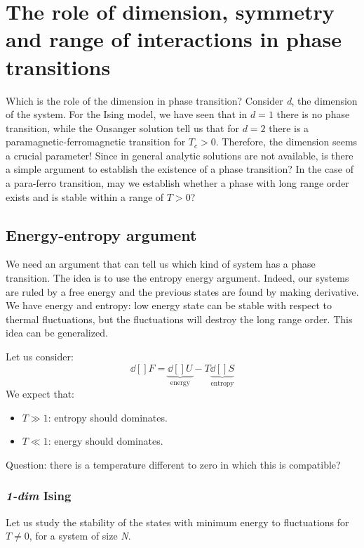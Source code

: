 \documentclass[../../Main/Main.tex]{subfiles}
\begin{document}
\chapter{The role of dimension, symmetry and range of interactions in phase transitions}

Which is the role of the dimension in phase transition? Consider \emph{d}, the dimension of the system.
For the Ising model, we have seen that in \( d=1 \) there is no phase transition, while the Onsanger solution tell us that for \( d=2 \) there is a paramagnetic-ferromagnetic transition for \( T_c >0 \).
Therefore, the dimension seems a crucial parameter!
Since in general analytic solutions are not available, is there a simple argument to establish the existence of a phase transition?
In the case of a para-ferro transition, may we establish whether a phase with long range order exists and is stable within a range of \( T>0 \)?

\section{Energy-entropy argument}
We need an argument that can tell us which kind of system has a phase transition. The idea is to use the entropy energy argument. Indeed, our systems are ruled by a free energy and the previous states are found by making derivative. We have energy and entropy: low energy state can be stable with respect to thermal fluctuations, but the fluctuations will destroy the long range order. This idea can be generalized.

Let us consider: 
\begin{equation}
  \dd[]{F} = \underbrace{\dd[]{U}}_{\text{energy}}  - T \underbrace{ \dd[]{S}}_{\text{entropy}}
\end{equation}
We expect that:
\begin{itemize}
\item \( T \gg 1\): entropy should dominates.
\item \( T \ll 1 \): energy should dominates.
\end{itemize}

\noindent Question: there is a temperature different to zero in which this is compatible?

\subsection{\emph{1-dim} Ising}
Let us study the stability of the states with minimum energy to fluctuations for \( T \neq 0 \), for a system of size  \emph{N}.
\end{document}
